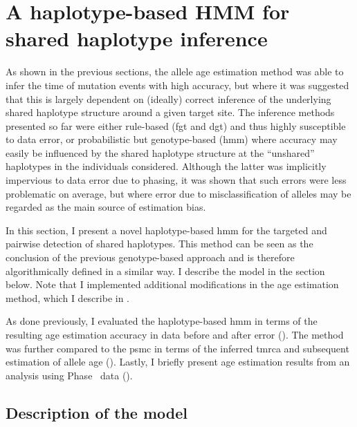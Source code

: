 %
%
%
%




%
\section{A haplotype-based HMM for shared haplotype inference}
%

As shown in the previous sections, the allele age estimation method was able to infer the time of mutation events with high accuracy, but where it was suggested that this is largely dependent on (ideally) correct inference of the underlying shared haplotype structure around a given target site.
The inference methods presented so far were either rule-based (\gls{fgt} and \gls{dgt}) and thus highly susceptible to data error, or probabilistic but genotype-based (\gls{hmm}) where accuracy may easily be influenced by the shared haplotype structure at the ``unshared'' haplotypes in the individuals considered.
Although the latter was implicitly impervious to data error due to phasing, it was shown that such errors were less problematic on average, but where error due to misclassification of alleles may be regarded as the main source of estimation bias.

In this section, I present a novel haplotype-based \gls{hmm} for the targeted and pairwise detection of shared haplotypes.
This method can be seen as the conclusion of the previous genotype-based approach and is therefore algorithmically defined in a similar way.
I describe the model in the section below.
Note that I implemented additional modifications in the age estimation method, which I describe in .

As done previously, I evaluated the haplotype-based \gls{hmm} in terms of the resulting age estimation accuracy in data before and after error ().
The method was further compared to the \gls{psmc} in terms of the inferred \gls{tmrca} and subsequent estimation of allele age ().
Lastly, I briefly present age estimation results from an analysis using  Phase~ data ().


%
\subsection{Description of the model}
%

